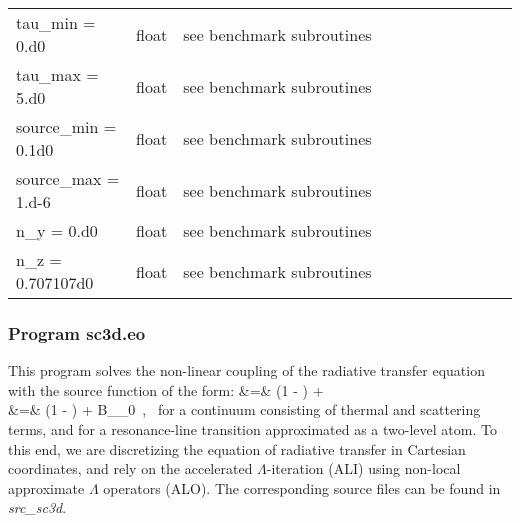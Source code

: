 \documentclass[10pt,a4paper]{article}
\begin{document}
\begin{footnotesize}
\begin{longtable}[h]{p{0.24\linewidth}p{0.07\linewidth}p{0.69\linewidth}}
tau\_min = 0.d0 & float & see benchmark subroutines \\
tau\_max = 5.d0 & float & see benchmark subroutines \\
source\_min = 0.1d0 & float & see benchmark subroutines \\
source\_max = 1.d-6 & float & see benchmark subroutines \\
n\_y = 0.d0 & float & see benchmark subroutines \\
n\_z = 0.707107d0 & float & see benchmark subroutines
\end{longtable}
\end{footnotesize}

\subsubsection{Program sc3d.eo}
This program solves the non-linear coupling of the radiative transfer equation with the source function of the form:
\beqa
\scont &=& \left(1 - \epsc \right) \Jnu + \epsc \Bnu \\
\sline &=& \left(1 - \epsl \right) \Jbar + \epsl B_{\nu_0} \,,
\eeqa
\ie~for a continuum consisting of thermal and scattering terms, and
for a resonance-line transition approximated as a two-level atom.
To this end, we are discretizing the equation of radiative transfer in
Cartesian coordinates, and rely on the accelerated $\Lambda$-iteration (ALI)
using non-local approximate $\Lambda$ operators (ALO). The
corresponding source files can be found in \textit{src\_sc3d}.
\end{document}
